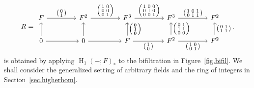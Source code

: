 \documentclass[a4paper]{amsart}
\theoremstyle{plain}
\theoremstyle{definition}
\theoremstyle{remark}
\begin{document}
\begin{equation}
\label{eq.intro-comm}
R = 
\begin{tikzcd}[column sep=15mm, ampersand replacement=\&]
F \ar{r}{\left(\begin{smallmatrix} 0 \\ 1 \end{smallmatrix}\right)} \& F^2\ar{r}{\left(\begin{smallmatrix} 1 & 0 \\ 0 & 0 \\0 & 1 \end{smallmatrix}\right)} \& F^3 \ar{r}{\left(\begin{smallmatrix} 1 & 0 & 0 \\ 0 & 1 & 0 \\ 0 & 0 & 1 \end{smallmatrix}\right)}\& F^3\ar{r}{\left(\begin{smallmatrix} 1 & 0 & 1\\ 0 & 1 & 1 \end{smallmatrix}\right)} \& F^2 \\
0\ar[u]\ar[r] \& 0\ar[u]\ar[r] \& F\ar[u]\ar{r}[swap]{\left(\begin{smallmatrix} 1 \\ 0 \end{smallmatrix}\right)} \ar{u}[swap]{\left(\begin{smallmatrix}0 \\ 1 \\ 0 \end{smallmatrix}\right)} \& F^2\ar{r}[swap]{\left(\begin{smallmatrix} 1 & 0\\ 0 & 1\end{smallmatrix}\right)}\ar{u}[swap]{\left(\begin{smallmatrix} 0 & 1 \\ 1 & 1 \\ 0 & 0 \end{smallmatrix}\right)} \& F^2\ar{u}[swap]{\left(\begin{smallmatrix} 0 & 1 \\ 1 & 1 \end{smallmatrix}\right)}
\end{tikzcd}.
\end{equation}
is obtained by applying $\operatorname{H}_1(-;F)_*$ to the bifiltration in Figure~\ref{fig.bifil}. We shall consider the generalized setting of arbitrary fields and the ring of integers in Section~\ref{sec.higherhom}.
\end{document}
